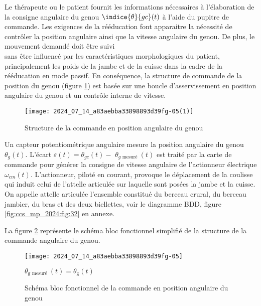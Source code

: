 Le thérapeute ou le patient fournit les informations nécessaires à l'élaboration de la consigne angulaire du genou $\indice{\theta}{g c}(t)$ à l'aide du pupitre de commande. Les exigences de la rééducation font apparaitre la nécessité de contrôler la position angulaire ainsi que la vitesse angulaire du genou. De plus, le mouvement demandé doit être suivi\\
sans être influencé par les caractéristiques morphologiques du patient, principalement les poids de la jambe et de la cuisse dans la cadre de la rééducation en mode passif. En conséquence, la structure de commande de la position du genou (figure \ref{fig:ccs_mp_2024:fig:07}) est basée sur une boucle d'asservissement en position angulaire du genou et un contrôle interne de vitesse.

\begin{figure}[!h]
\centering
\texttt{[image: 2024\_07\_14\_a83aebba33898893d39fg-05(1)]}
\caption{\label{fig:ccs_mp_2024:fig:07}Structure de la commande en position angulaire du genou}
\end{figure}
Un capteur potentiométrique angulaire mesure la position angulaire du genou $\theta_{g}(t)$. L'écart $\varepsilon(t)=\theta_{g c}(t)-$ $\theta_{g \text { mesuré }}(t)$ est traité par la carte de commande pour générer la consigne de vitesse angulaire de l'actionneur électrique $\omega_{c m}(t)$. L'actionneur, piloté en courant, provoque le déplacement de la coulisse qui induit celui de l'attelle articulée sur laquelle sont posées la jambe et la cuisse. On appelle attelle articulée l'ensemble constitué du berceau crural, du berceau jambier, du bras et des deux biellettes, voir le diagramme BDD, figure \ref{fig:ccs_mp_2024:fig:32} en annexe.


La figure \ref{fig:ccs_mp_2024:fig:08} représente le schéma bloc fonctionnel simplifié de la structure de la commande angulaire du genou.

\begin{figure}[!h]\centering
\texttt{[image: 2024\_07\_14\_a83aebba33898893d39fg-05]}

$\theta_{\mathrm{g} \text { mesuré }}(t)=\theta_{\mathrm{g}}(t)$

\caption{\label{fig:ccs_mp_2024:fig:08}Schéma bloc fonctionnel de la commande en position angulaire du genou}
\end{figure}

